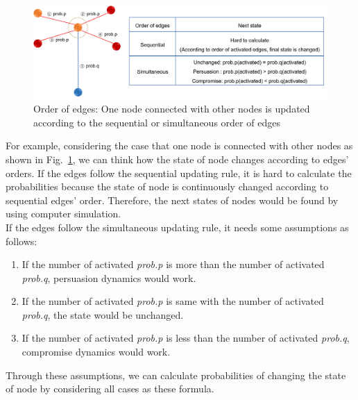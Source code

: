 \begin{figure}[!htb]
	\centering
	\includegraphics[width=\hsize]{figure/chap4_edgeorder_explanation.png}
	\caption{Order of edges: One node connected with other nodes is updated according to the sequential or simultaneous order of edges}
	\label{edgeorder_explanation}
\end{figure}  
For example, considering the case that one node is connected with other nodes as shown in Fig.~\ref{edgeorder_explanation}, we can think how the state of node changes according to edges' orders. If the edges follow the sequential updating rule, it is hard to calculate the probabilities because the state of node is continuously changed according to sequential edges' order. Therefore, the next states of nodes would be found by using computer simulation.\\
If the edges follow the simultaneous updating rule, it needs some assumptions as follows: 
\begin{enumerate}
	\item If the number of activated \textit{prob.p} is more than the number of activated \textit{prob.q}, persuasion dynamics would work. 
	\item If the number of activated \textit{prob.p} is same with the number of activated \textit{prob.q}, the state would be unchanged.
	\item If the number of activated \textit{prob.p} is less than the number of activated \textit{prob.q}, compromise dynamics would work.
\end{enumerate}

Through these assumptions, we can calculate probabilities of changing the state of node by considering all cases as these formula.  

